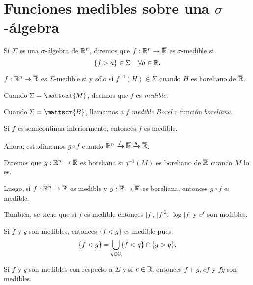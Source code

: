 \section{Funciones medibles sobre una $\sigma$-\'algebra}

\begin{definicion}{}
Si $\Sigma$ es una $\sigma$-\'algebra de $\mathbb{R}^n$, diremos que $f:\mathbb{R}^n\to \overline{\mathbb{R}}$ es $\sigma$-medible si 
\[\{f>a\} \in \Sigma\;\;\;\;\forall a \in \mathbb{R}.\]
\end{definicion}

\begin{proposicion}{}
$f:\mathbb{R}^n \to \overline{\mathbb{R}}$ es $\Sigma$-medible si y s\'olo si
$f^{-1}(H)\in \Sigma$ cuando $H$ es boreliano de $\overline{\mathbb{R}}$.
\end{proposicion}

Cuando $\Sigma=\mahtcal{M}$, decimos que $f$ es \emph{medible}.

Cuando $\Sigma=\mahtscr{B}$, llamamos a $f$ \emph{medible Borel} o funci\'on \emph{boreliana}.

\begin{ejercicio}{}
Si $f$ es semicontinua inferiormente, entonces $f$ es medible. 
\end{ejercicio}

Ahora, estudiaremos $g\circ f$ cuando 
$\mathbb{R}^n \xrightarrow{f}\overline{\mathbb{R}} \xrightarrow {g} \overline{\mathbb{R}}$.

\begin{definicion}{}
Diremos que $g: \mathbb{R}^n \to \overline{\mathbb{R}}$ es boreliana si $g^{-1}(M)$ es boreliano de $\overline{\mathbb{R}}$ cuando $M$ lo es.
\end{definicion}

Luego, si $f:\mathbb{R}^n \to \overline{\mathbb{R}}$ es medible y $g:\overline{\mathbb{R}} \to \overline{\mathbb{R}}$ es boreliana, entonces $g\circ f$ es medible.

Tambi\'en, se tiene que si $f$ es medible entonces $|f|$, $|f|^2$, $\log|f|$ y $e^f$ son medibles. 

Si $f$ y $g$ son medibles, entonces $\{f<g\}$ es medible pues
\[
\{f<g\}=\bigcup\limits_{q \in \mathbb{Q}} \{ f<q\} \cap \{ g>q\}.
\]
\begin{proposicion}{}
Si $f$ y $g$ son medibles con respecto a $\Sigma$ y si $c\in \mathbb{R}$, entonces
$f+g$, $cf$ y $fg$ son medibles.
\end{proposicion}

